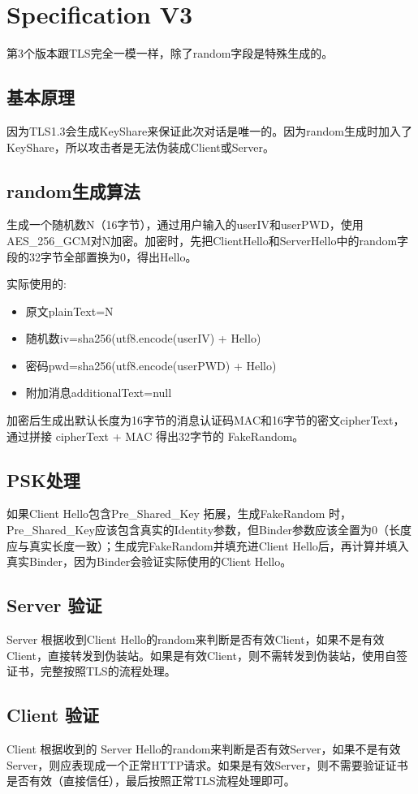 \chapter{Specification V3}
第3个版本跟TLS完全一模一样，除了random字段是特殊生成的。

\section{基本原理}
因为TLS1.3会生成KeyShare来保证此次对话是唯一的。因为random生成时加入了KeyShare，所以攻击者是无法伪装成Client或Server。

\section{random生成算法}
生成一个随机数N（16字节），通过用户输入的userIV和userPWD，使用AES\_256\_GCM对N加密。加密时，先把ClientHello和ServerHello中的random字段的32字节全部置换为0，得出Hello。

实际使用的:
\begin{itemize}
	\item 原文plainText=N
	\item 随机数iv=sha256(utf8.encode(userIV) + Hello)
	\item 密码pwd=sha256(utf8.encode(userPWD) + Hello)
	\item 附加消息additionalText=null
\end{itemize}

加密后生成出默认长度为16字节的消息认证码MAC和16字节的密文cipherText，通过拼接 cipherText + MAC 得出32字节的 FakeRandom。

\section{PSK处理}
如果Client Hello包含Pre\_Shared\_Key 拓展，生成FakeRandom 时，Pre\_Shared\_Key应该包含真实的Identity参数，但Binder参数应该全置为0（长度应与真实长度一致）；生成完FakeRandom并填充进Client Hello后，再计算并填入真实Binder，因为Binder会验证实际使用的Client Hello。

\section{Server 验证}
Server 根据收到Client Hello的random来判断是否有效Client，如果不是有效Client，直接转发到伪装站。如果是有效Client，则不需转发到伪装站，使用自签证书，完整按照TLS的流程处理。

\section{Client 验证}
Client 根据收到的 Server Hello的random来判断是否有效Server，如果不是有效Server，则应表现成一个正常HTTP请求。如果是有效Server，则不需要验证证书是否有效（直接信任），最后按照正常TLS流程处理即可。
